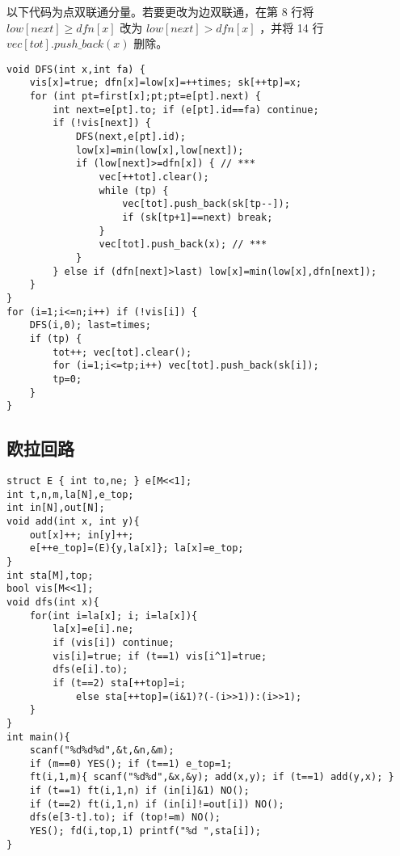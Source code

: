 \documentclass[landscape,a4paper]{article}
\begin{document}
以下代码为点双联通分量。若要更改为边双联通，在第 8 行将 $low[next] \geq dfn[x]$ 改为 $low[next] > dfn[x]$ ，并将 14 行 $vec[tot].push\_back(x)$ 删除。

\begin{lstlisting}
void DFS(int x,int fa) {
	vis[x]=true; dfn[x]=low[x]=++times; sk[++tp]=x;
	for (int pt=first[x];pt;pt=e[pt].next) {
		int next=e[pt].to; if (e[pt].id==fa) continue;
		if (!vis[next]) {
			DFS(next,e[pt].id);
			low[x]=min(low[x],low[next]);
			if (low[next]>=dfn[x]) { // ***
				vec[++tot].clear();
				while (tp) {
					vec[tot].push_back(sk[tp--]);
					if (sk[tp+1]==next) break;
				}
				vec[tot].push_back(x); // ***
			}
		} else if (dfn[next]>last) low[x]=min(low[x],dfn[next]);
	}
}
for (i=1;i<=n;i++) if (!vis[i]) {
	DFS(i,0); last=times;
	if (tp)	{
		tot++; vec[tot].clear();
		for (i=1;i<=tp;i++) vec[tot].push_back(sk[i]);
		tp=0;
	}
}
\end{lstlisting}

\subsection{欧拉回路}
\begin{lstlisting}
struct E { int to,ne; } e[M<<1];
int t,n,m,la[N],e_top;
int in[N],out[N];
void add(int x, int y){
	out[x]++; in[y]++;
	e[++e_top]=(E){y,la[x]}; la[x]=e_top;
}
int sta[M],top;
bool vis[M<<1];
void dfs(int x){
	for(int i=la[x]; i; i=la[x]){
		la[x]=e[i].ne;
		if (vis[i]) continue;
		vis[i]=true; if (t==1) vis[i^1]=true;		
		dfs(e[i].to);
		if (t==2) sta[++top]=i;
			else sta[++top]=(i&1)?(-(i>>1)):(i>>1);
	}
}
int main(){
	scanf("%d%d%d",&t,&n,&m);
	if (m==0) YES(); if (t==1) e_top=1;
	ft(i,1,m){ scanf("%d%d",&x,&y); add(x,y); if (t==1) add(y,x); }
	if (t==1) ft(i,1,n) if (in[i]&1) NO();
	if (t==2) ft(i,1,n) if (in[i]!=out[i]) NO();
	dfs(e[3-t].to); if (top!=m) NO();
	YES(); fd(i,top,1) printf("%d ",sta[i]);
}
\end{lstlisting}
\end{document}
